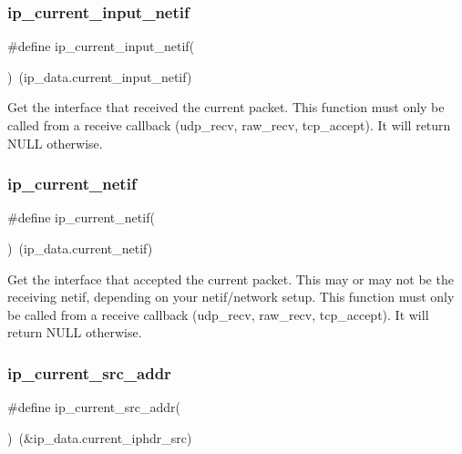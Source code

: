 \subsubsection{\texorpdfstring{ip\+\_\+current\+\_\+input\+\_\+netif}{ip\_current\_input\_netif}}
{\footnotesize\ttfamily \#define ip\+\_\+current\+\_\+input\+\_\+netif(\begin{DoxyParamCaption}{ }\end{DoxyParamCaption})~(ip\+\_\+data.\+current\+\_\+input\+\_\+netif)}

Get the interface that received the current packet. This function must only be called from a receive callback (udp\+\_\+recv, raw\+\_\+recv, tcp\+\_\+accept). It will return N\+U\+LL otherwise. \mbox{\label{openmote-cc2538_2lwip_2src_2include_2lwip_2ip_8h_aabecef3c7653a9767c79245c44fcab9f}} 
\subsubsection{\texorpdfstring{ip\+\_\+current\+\_\+netif}{ip\_current\_netif}}
{\footnotesize\ttfamily \#define ip\+\_\+current\+\_\+netif(\begin{DoxyParamCaption}{ }\end{DoxyParamCaption})~(ip\+\_\+data.\+current\+\_\+netif)}

Get the interface that accepted the current packet. This may or may not be the receiving netif, depending on your netif/network setup. This function must only be called from a receive callback (udp\+\_\+recv, raw\+\_\+recv, tcp\+\_\+accept). It will return N\+U\+LL otherwise. \mbox{\label{openmote-cc2538_2lwip_2src_2include_2lwip_2ip_8h_a4e35b7692c228c98e738892f0a215647}} 
\subsubsection{\texorpdfstring{ip\+\_\+current\+\_\+src\+\_\+addr}{ip\_current\_src\_addr}\hspace{0.1cm}{\footnotesize\ttfamily [1/2]}}
{\footnotesize\ttfamily \#define ip\+\_\+current\+\_\+src\+\_\+addr(\begin{DoxyParamCaption}{ }\end{DoxyParamCaption})~(\&ip\+\_\+data.\+current\+\_\+iphdr\+\_\+src)}

